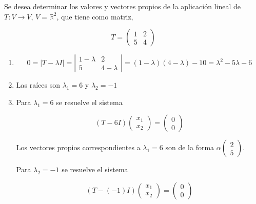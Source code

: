 \begin{example}
\label{ejemploaut}
\noindent
Se desea determinar los valores y vectores propios de la aplicación lineal de $T: V \rightarrow V$, $V=\mathbb{R}^2$, que tiene como matriz, 

\bigskip

$$T=\left(\begin{array}{cc}  1 & 2  \\ 5 &  4
\end{array}
 \right)$$

\begin{enumerate}
\item
\[
0= 
\left   | T -  \lambda I   \right  |=\left | \begin{array}{cc}
1- \lambda  & 2  \\
5 &  4- \lambda 
\end{array}
\right|=(1- \lambda)(4- \lambda)-10= \lambda^2 - 5 \lambda -6
\]


\bigskip

\item
Las raíces son $\lambda_1= 6$ y $\lambda_2=-1$

\bigskip


\item

Para $\lambda_1= 6$  se resuelve el sistema 

$$(T-6I) \left(\begin{array}{c}  x_1  \\ x_2 
\end{array}
 \right)=  \left(\begin{array}{c}  0  \\ 0 
\end{array}
 \right) $$

 Los vectores propios correspondientes a $\lambda_1= 6$  son de la forma $ \alpha  \left(\begin{array}{c}  2  \\ 5 
\end{array}
 \right)$.

\bigskip

 
Para $\lambda_2= -1$  se resuelve el sistema 

$$(T-(-1)I) \left(\begin{array}{c}  x_1  \\ x_2 
\end{array}
 \right)=  \left(\begin{array}{c}  0  \\ 0 
\end{array}
 \right) $$


\end{enumerate}
\end{example}
